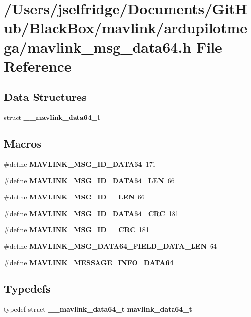 \section{/\+Users/jselfridge/\+Documents/\+Git\+Hub/\+Black\+Box/mavlink/ardupilotmega/mavlink\+\_\+msg\+\_\+data64.h File Reference}
\label{mavlink__msg__data64_8h}
\subsection*{Data Structures}
\begin{DoxyCompactItemize}
\item 
struct \textbf{ \+\_\+\+\_\+mavlink\+\_\+data64\+\_\+t}
\end{DoxyCompactItemize}
\subsection*{Macros}
\begin{DoxyCompactItemize}
\item 
\#define \textbf{ M\+A\+V\+L\+I\+N\+K\+\_\+\+M\+S\+G\+\_\+\+I\+D\+\_\+\+D\+A\+T\+A64}~171
\item 
\#define \textbf{ M\+A\+V\+L\+I\+N\+K\+\_\+\+M\+S\+G\+\_\+\+I\+D\+\_\+\+D\+A\+T\+A64\+\_\+\+L\+EN}~66
\item 
\#define \textbf{ M\+A\+V\+L\+I\+N\+K\+\_\+\+M\+S\+G\+\_\+\+I\+D\+\_\+\_\+\+L\+EN}~66
\item 
\#define \textbf{ M\+A\+V\+L\+I\+N\+K\+\_\+\+M\+S\+G\+\_\+\+I\+D\+\_\+\+D\+A\+T\+A64\+\_\+\+C\+RC}~181
\item 
\#define \textbf{ M\+A\+V\+L\+I\+N\+K\+\_\+\+M\+S\+G\+\_\+\+I\+D\+\_\+\_\+\+C\+RC}~181
\item 
\#define \textbf{ M\+A\+V\+L\+I\+N\+K\+\_\+\+M\+S\+G\+\_\+\+D\+A\+T\+A64\+\_\+\+F\+I\+E\+L\+D\+\_\+\+D\+A\+T\+A\+\_\+\+L\+EN}~64
\item 
\#define \textbf{ M\+A\+V\+L\+I\+N\+K\+\_\+\+M\+E\+S\+S\+A\+G\+E\+\_\+\+I\+N\+F\+O\+\_\+\+D\+A\+T\+A64}
\end{DoxyCompactItemize}
\subsection*{Typedefs}
\begin{DoxyCompactItemize}
\item 
typedef struct \textbf{ \+\_\+\+\_\+mavlink\+\_\+data64\+\_\+t} \textbf{ mavlink\+\_\+data64\+\_\+t}
\end{DoxyCompactItemize}


